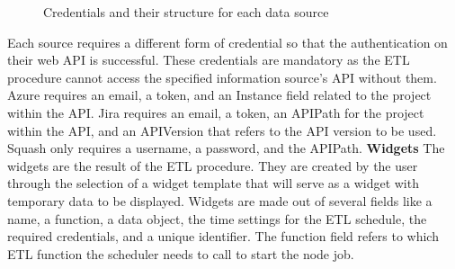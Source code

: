 \documentclass[a4paper,twoside,10pt]{report}
\begin{document}
\newline
\begin{figure}[h!]
\center
\caption{Credentials and their structure for each data source}
\end{figure}
\newline
Each source requires a different form of credential so that the authentication on their web API is successful. These credentials are mandatory as the ETL procedure cannot access the specified information source's API without them.
\newline
Azure requires an email, a token, and an Instance field related to the project within the API.
\newline
Jira requires an email, a token, an APIPath for the project within the API, and an APIVersion that refers to the API version to be used.
\newline
Squash only requires a username, a password, and the APIPath.
\newline
\newline
\newline
\newline
\textbf{Widgets}
\newline
The widgets are the result of the ETL procedure.
\newline
They are created by the user through the selection of a widget template that will serve as a widget with temporary data to be displayed.
\newline
Widgets are made out of several fields like a name, a function, a data object, the time settings for the ETL schedule, the required credentials, and a unique identifier.
\newline
The function field refers to which ETL function the scheduler needs to call to start the node job.
\end{document}
